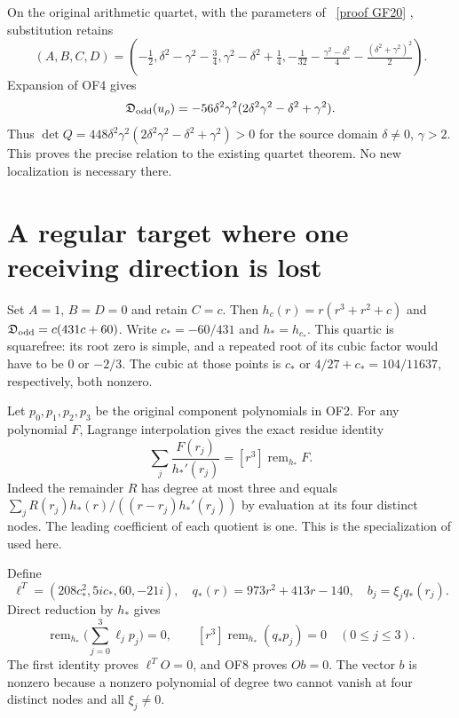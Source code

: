 \documentclass[11pt]{article}
\newcommand{\dd}{\mathfrak D_{\rm odd}}
\newcommand{\rem}{\operatorname{rem}}
\begin{document}
On the original arithmetic quartet, with the parameters of
\cite[GF20]{Fable}%
~\href{https://github.com/KokunoYumeto/zeta-function-research-reader/blob/5992ad50c0f2a06921f1fcaded7b4e38097c0739/workbenches/splitzero-tandem/continuations/20260920-original-kernel-mixed-determinants/providers/FABLE_TO_ORIGINAL_CONDUCTOR.tex\#L1598}{[proof GF20]}%
{}, substitution retains
\begin{equation}
 (A,B,C,D)=\left(-\tfrac12,\delta^2-\gamma^2-\tfrac34,
 \gamma^2-\delta^2+\tfrac14,
 -\tfrac1{32}-\tfrac{\gamma^2-\delta^2}{4}
 -\tfrac{(\delta^2+\gamma^2)^2}{2}\right).
 \tag{OF7}
\end{equation}
Expansion of OF4 gives
\[
 \dd(u_\rho)=-56\delta^2\gamma^2
                 (2\delta^2\gamma^2-\delta^2+\gamma^2).
\]
Thus $\det Q=448\delta^2\gamma^2
(2\delta^2\gamma^2-\delta^2+\gamma^2)>0$ for the source domain
$\delta\ne0$, $\gamma>2$. This proves the precise relation to the
existing quartet theorem. No new localization is necessary there.

\section{A regular target where one receiving direction is lost}
Set $A=1$, $B=D=0$ and retain $C=c$. Then
$h_c(r)=r(r^3+r^2+c)$ and $\dd=c(431c+60)$.
Write $c_*=-60/431$ and $h_*=h_{c_*}$. This quartic is squarefree:
its root zero is simple, and a repeated root of its cubic factor
would have to be $0$ or $-2/3$. The cubic at those points is $c_*$
or $4/27+c_*=104/11637$, respectively, both nonzero.

Let $p_0,p_1,p_2,p_3$ be the original component polynomials in OF2.
For any polynomial $F$, Lagrange interpolation gives the exact
residue identity
\begin{equation}
 \sum_j\frac{F(r_j)}{h_*'(r_j)}=[r^3]\rem_{h_*}F.\tag{OF8}
\end{equation}
Indeed the remainder $R$ has degree at most three and equals
$\sum_jR(r_j)h_*(r)/((r-r_j)h_*'(r_j))$ by evaluation at its four
distinct nodes. The leading coefficient of each quotient is one.
This is the specialization of \cite[3.3.1--3.3.3\_1]{Temme} used here.

Define
\begin{equation}
 \ell^T=(208c_*^2,5ic_*,60,-21i),\quad
 q_*(r)=973r^2+413r-140,\quad b_j=\xi_jq_*(r_j).
 \tag{OF9}
\end{equation}
Direct reduction by $h_*$ gives
\[
 \rem_{h_*}\Big(\sum_{j=0}^3\ell_jp_j\Big)=0,
 \qquad [r^3]\rem_{h_*}(q_*p_j)=0\quad(0\le j\le3).
\]
The first identity proves $\ell^TO=0$, and OF8 proves $Ob=0$.
The vector $b$ is nonzero because a nonzero polynomial of degree two
cannot vanish at four distinct nodes and all $\xi_j\ne0$.
\end{document}
